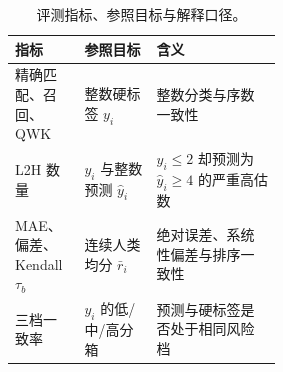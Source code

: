 \begin{table}[htbp]
\centering
\caption{评测指标、参照目标与解释口径。}
\label{tab:metric_contract}
\small
\renewcommand{\arraystretch}{1.12}
\begin{tabularx}{\linewidth}{@{}>{\raggedright\arraybackslash}p{0.26\linewidth}>{\raggedright\arraybackslash}p{0.27\linewidth}Y@{}}
\toprule
指标 & 参照目标 & 含义 \\
\midrule
精确匹配、召回、QWK & 整数硬标签 $y_i$ & 整数分类与序数一致性 \\
L2H 数量 & $y_i$ 与整数预测 $\hat y_i$ & $y_i\leq 2$ 却预测为 $\hat y_i\geq 4$ 的严重高估数 \\
MAE、偏差、Kendall $\tau_b$ & 连续人类均分 $\bar r_i$ & 绝对误差、系统性偏差与排序一致性 \\
三档一致率 & $y_i$ 的低/中/高分箱 & 预测与硬标签是否处于相同风险档 \\
\bottomrule
\end{tabularx}
\end{table}
